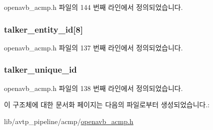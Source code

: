 openavb\+\_\+acmp.\+h 파일의 144 번째 라인에서 정의되었습니다.

\subsubsection[{\texorpdfstring{talker\+\_\+entity\+\_\+id}{talker_entity_id}}]{ talker\+\_\+entity\+\_\+id\mbox{[}8\mbox{]}}\hypertarget{structopenavb__acmp___listener_stream_info__t_a9a599b9c25c2171c3e76f269d9a04f51}{}\label{structopenavb__acmp___listener_stream_info__t_a9a599b9c25c2171c3e76f269d9a04f51}


openavb\+\_\+acmp.\+h 파일의 137 번째 라인에서 정의되었습니다.

\subsubsection[{\texorpdfstring{talker\+\_\+unique\+\_\+id}{talker_unique_id}}]{ talker\+\_\+unique\+\_\+id}\hypertarget{structopenavb__acmp___listener_stream_info__t_a545e994bde6218210bb41265ac298837}{}\label{structopenavb__acmp___listener_stream_info__t_a545e994bde6218210bb41265ac298837}


openavb\+\_\+acmp.\+h 파일의 138 번째 라인에서 정의되었습니다.



이 구조체에 대한 문서화 페이지는 다음의 파일로부터 생성되었습니다.\+:\begin{DoxyCompactItemize}
\item 
lib/avtp\+\_\+pipeline/acmp/\hyperlink{openavb__acmp_8h}{openavb\+\_\+acmp.\+h}\end{DoxyCompactItemize}
